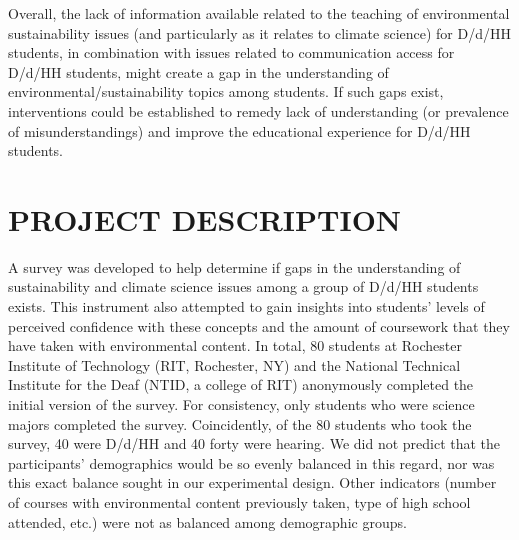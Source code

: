 \documentclass[11.5pt]{sig-alternate} %
\begin{document}
\begin{large}
Overall, the lack of information available related to the teaching of environmental sustainability issues (and particularly as it relates to climate science) for D/d/HH students, in combination with issues related to communication access for D/d/HH students, might create a gap in the understanding of environmental/sustainability topics among students.  If such gaps exist, interventions could be established to remedy lack of understanding (or prevalence of misunderstandings) and improve the educational experience for D/d/HH students.  

\section*{PROJECT DESCRIPTION}

A survey was developed to help determine if gaps in the understanding of sustainability and climate science issues among a group of D/d/HH students exists.  This instrument also attempted to gain insights into students’ levels of perceived confidence with these concepts and the amount of coursework that they have taken with environmental content.  In total, 80 students at Rochester Institute of Technology (RIT, Rochester, NY) and the National Technical Institute for the Deaf (NTID, a college of RIT) anonymously completed the initial version of the survey.  For consistency, only students who were science majors completed the survey.  Coincidently, of the 80 students who took the survey, 40 were D/d/HH and 40 forty were hearing. We did not predict that the participants’ demographics would be so evenly balanced in this regard, nor was this exact balance sought in our experimental design.  Other indicators (number of courses with environmental content previously taken, type of high school attended, etc.) were not as balanced among demographic groups.  


\end{large}
\end{document}
